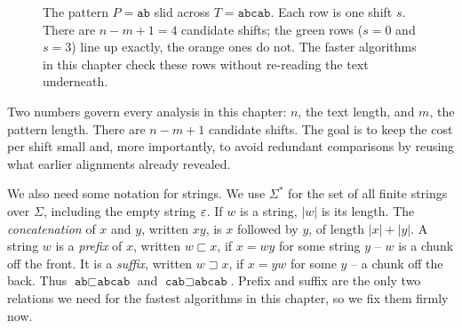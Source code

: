 \begin{figure}[H]
\centering
{}
\caption{The pattern $P=\texttt{ab}$ slid across $T=\texttt{abcab}$. Each row is
one shift $s$. There are $n-m+1=4$ candidate shifts; the green rows ($s=0$ and
$s=3$) line up exactly, the orange ones do not. The faster algorithms in this
chapter check these rows without re-reading the text underneath.}
\label{ch31:fig-shifts}
\end{figure}

\begin{focusbox}
Two numbers govern every analysis in this chapter: $n$, the text length, and
$m$, the pattern length. There are $n-m+1$ candidate shifts. The goal
is to keep the cost per shift small and, more importantly, to avoid redundant
comparisons by reusing what earlier alignments already revealed.
\end{focusbox}

We also need some notation for strings. We use $\Sigma^*$ for the set of all finite
strings over $\Sigma$, including the empty string $\varepsilon$. If $w$ is a string,
$|w|$ is its length. The \emph{concatenation} of $x$ and $y$, written $xy$, is
$x$ followed by $y$, of length $|x|+|y|$. A string $w$ is a \emph{prefix} of
$x$, written $w \sqsubset x$, if $x = wy$ for some string $y$ -- $w$ is a chunk
off the front. It is a \emph{suffix}, written $w \sqsupset x$, if $x = yw$ for
some $y$ -- a chunk off the back. Thus $\texttt{ab} \sqsubset \texttt{abcab}$
and $\texttt{cab} \sqsupset \texttt{abcab}$. Prefix and suffix are the only two
relations we need for the fastest algorithms in this chapter, so we fix them
firmly now.

